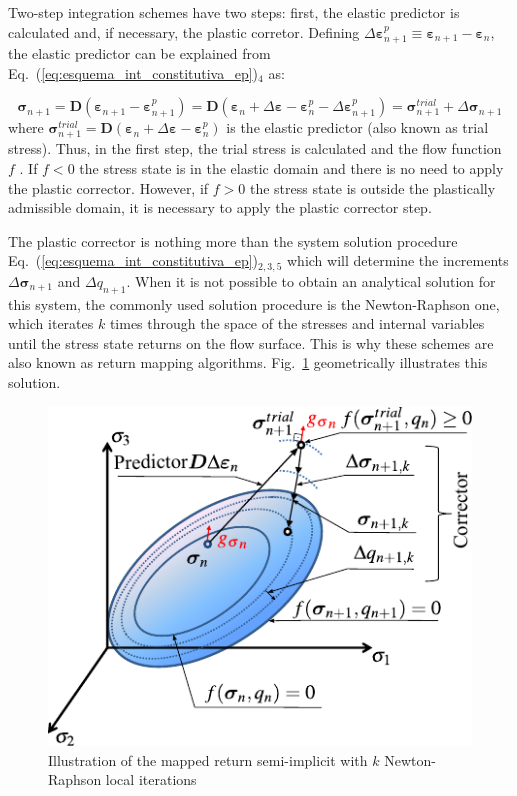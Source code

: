 \documentclass[Journal,letterpaper]{ascelike-new}
\newcommand{\Dsdee}{\boldsymbol{D}}
\newcommand{\strainp}{\boldsymbol{\varepsilon}^{p}}
\newcommand{\strain}{\boldsymbol{\varepsilon}}
\newcommand{\stress}{\boldsymbol{\sigma}}
\begin{document}
Two-step integration schemes have two steps: first, the elastic predictor is calculated and, if necessary, the plastic corretor. Defining  $\Delta \strainp_{n+1} \equiv \strain_{n+1} - \strain_{n}$, the elastic predictor can be explained from Eq.~(\ref{eq:esquema_int_constitutiva_ep})$_4$ as: 

\begin{equation}
	\label{eq:preditor_elastico}
	\stress_{n+1} = \Dsdee(\strain_{n+1}-\strain_{n+1}^p) = \Dsdee(\strain_n+\Delta \strain-\strain_{n}^ p-\Delta \strain_{n+1}^p) = \stress_{n+1}^{trial} + \Delta \stress_{n+1}
\end{equation}
where $\stress_{n+1}^{trial} = \Dsdee (\strain_n+\Delta \strain-\strain_{n}^ p)$ is the elastic predictor (also known as trial stress). Thus, in the first step, the trial stress is calculated and the flow function $f$  . If  $f<0$  the stress state is in the elastic domain and there is no need to apply the plastic corrector. However, if $f>0$ the stress state is outside the plastically admissible domain, it is necessary to apply the plastic corrector step.

The plastic corrector is nothing more than the system solution procedure Eq.~(\ref{eq:esquema_int_constitutiva_ep})$_{2,3,5}$ which will determine the increments $\Delta \stress_{n+1}$ and $\Delta q_{n+1}$. When it is not possible to obtain an analytical solution for this system, the commonly used solution procedure is the Newton-Raphson one, which iterates $k$ times through the space of the stresses and internal variables until the stress state returns on the flow surface. This is why these schemes are also known as return mapping algorithms. Fig.~\ref{ep-algorithm-representation} geometrically illustrates this solution.

\begin{figure}
	\centering
	\includegraphics[scale=1]{ep-algorithm-representation.pdf}
	\caption{Illustration of the mapped return semi-implicit with $k$ Newton-Raphson local iterations}
	\label{ep-algorithm-representation}
\end{figure}
\end{document}
